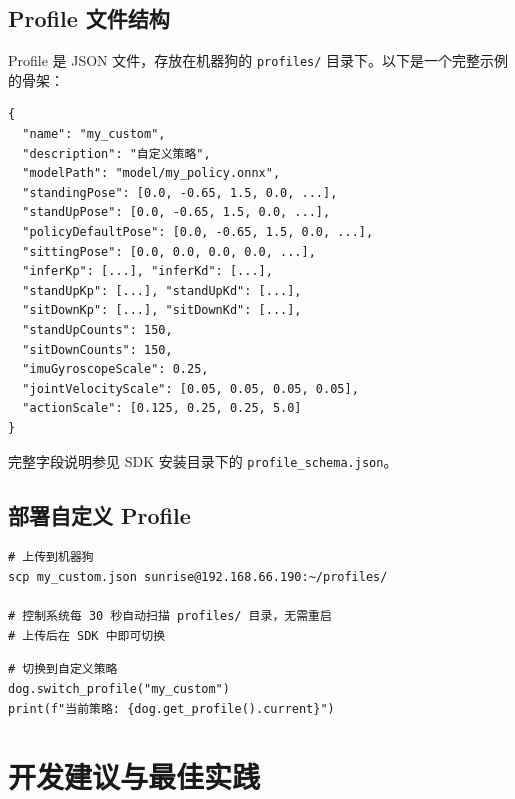 \documentclass[a4paper,11pt,openany]{book}
\begin{document}
\subsection{Profile 文件结构}

Profile 是 JSON 文件，存放在机器狗的 \texttt{profiles/} 目录下。以下是一个完整示例的骨架：

\begin{lstlisting}[style=plain]
{
  "name": "my_custom",
  "description": "自定义策略",
  "modelPath": "model/my_policy.onnx",
  "standingPose": [0.0, -0.65, 1.5, 0.0, ...],
  "standUpPose": [0.0, -0.65, 1.5, 0.0, ...],
  "policyDefaultPose": [0.0, -0.65, 1.5, 0.0, ...],
  "sittingPose": [0.0, 0.0, 0.0, 0.0, ...],
  "inferKp": [...], "inferKd": [...],
  "standUpKp": [...], "standUpKd": [...],
  "sitDownKp": [...], "sitDownKd": [...],
  "standUpCounts": 150,
  "sitDownCounts": 150,
  "imuGyroscopeScale": 0.25,
  "jointVelocityScale": [0.05, 0.05, 0.05, 0.05],
  "actionScale": [0.125, 0.25, 0.25, 5.0]
}
\end{lstlisting}

完整字段说明参见 SDK 安装目录下的 \texttt{profile\_schema.json}。

\subsection{部署自定义 Profile}

\begin{lstlisting}[style=bash]
# 上传到机器狗
scp my_custom.json sunrise@192.168.66.190:~/profiles/

# 控制系统每 30 秒自动扫描 profiles/ 目录，无需重启
# 上传后在 SDK 中即可切换
\end{lstlisting}

\begin{lstlisting}[style=python]
# 切换到自定义策略
dog.switch_profile("my_custom")
print(f"当前策略: {dog.get_profile().current}")
\end{lstlisting}

\section{开发建议与最佳实践}
\end{document}
